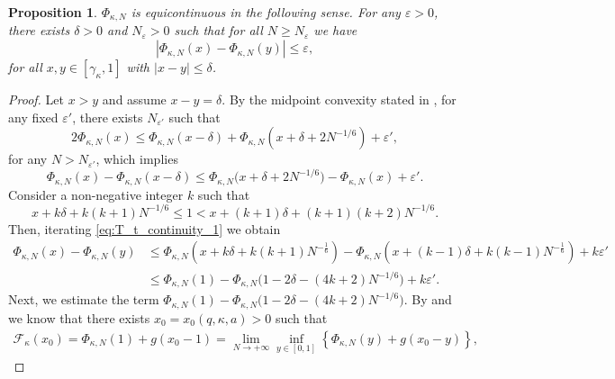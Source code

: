 \documentclass[reqno,11pt]{amsart}
\newcommand{\lln}{\gamma_\kappa}
\numberwithin{equation}{section}
\newtheorem{proposition}{Proposition}[section]
\theoremstyle{definition}
\begin{document}
\begin{proposition}\label{prop:equicont} $\Phi_{\kappa,N}$ is equicontinuous in the following sense. For any $\varepsilon>0$, there exists $\delta>0$ and $N_\varepsilon>0$ such that for all $N\ge N_\varepsilon$ we have
    $$
    |\Phi_{\kappa,N}(x)-\Phi_{\kappa,N}(y)|\le \varepsilon,
    $$ 
    for all $x,y\in[\lln,1]$ with $|x-y|\le \delta$.
\end{proposition}

\begin{proof} 
    Let $x>y$ and assume $x-y=\delta$. By the midpoint convexity stated in , for any fixed $\varepsilon'$, there exists $N_{\varepsilon'}$ such that
   \begin{equation*}
        2 \Phi_{\kappa,N}(x) \le \Phi_{\kappa,N}(x-\delta) + \Phi_{\kappa,N}(x+\delta+2N^{-1/6}) + \varepsilon',
    \end{equation*}
    for any $N>N_{\varepsilon'}$, which implies
    \begin{equation} \label{eq:T_t_continuity_1}
        \Phi_{\kappa,N}(x) - \Phi_{\kappa,N}(x-\delta) \le \Phi_{\kappa,N}\big(x+\delta+2N^{-1/6}\big) - \Phi_{\kappa,N}(x) + \varepsilon'. 
    \end{equation}
    Consider a non-negative integer $k$ such that
    \begin{equation*}
       x+k\delta+k(k+1)N^{-1/6} \le 1 < x+(k+1)\delta+(k+1)(k+2)N^{-1/6}.
    \end{equation*}
    Then, iterating \eqref{eq:T_t_continuity_1} we obtain
    \begin{align} \nonumber
            \Phi_{\kappa,N}(x)-\Phi_{\kappa,N}(y) &\le \Phi_{\kappa,N}\left(x+k\delta+k(k+1)N^{-\frac16}\right)-\Phi_{\kappa,N}\left(x+(k-1)\delta+k(k-1)N^{-\frac16}\right) + k\varepsilon'
            \\
            &\le \Phi_{\kappa,N}(1) - \Phi_{\kappa,N}\bigg(1-2\delta-(4k+2)N^{-1/6}\bigg) + k\varepsilon'. \label{eq:T_t_continuity_2}
    \end{align}
    Next, we estimate the term $\Phi_{\kappa,N}(1) - \Phi_{\kappa,N}\big(1-2\delta-(4k+2)N^{-1/6}\big)$. By  and  we know that there exists $x_0=x_0(q,\kappa,a)>0$ such that 
    \begin{equation*}
    \begin{split}
        \mathcal{F}_\kappa(x_0) = \Phi_{\kappa,N}(1) + g(x_0-1) = \lim_{N \to +\infty} \inf_{y\in [0,1]} \left\{ \Phi_{\kappa,N}(y) + g(x_0-y) \right\},
    \end{split}

\end{equation*}
\end{proof}
\end{document}
